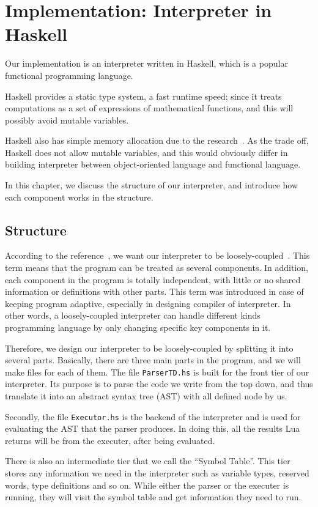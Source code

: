 \chapter{Implementation: Interpreter in Haskell}\label{chp: implementation}
Our implementation is an interpreter written in Haskell, which is a popular functional programming language. 

Haskell provides a static type system, a fast runtime speed; since it treats computations as a set of expressions of mathematical functions, and this will possibly avoid mutable variables. 

Haskell also has simple memory allocation due to the research~\cite{PIH}. As the trade off, Haskell does not allow mutable variables, and this would obviously differ in building interpreter between object-oriented language and functional language.

In this chapter, we discuss the structure of our interpreter, and introduce how each component works in the structure.

\section{Structure}
According to the reference~\cite{WCAI}, we want our interpreter to be loosely-coupled~\cite{looseC}. This term means that the program can be treated as several components. In addition, each component in the program is totally independent, with little or no shared information or definitions with other parts. This term was introduced in case of keeping program adaptive, especially in designing compiler of interpreter. In other words, a loosely-coupled interpreter can handle different kinds programming language by only changing specific key components in it.

Therefore, we design our interpreter to be loosely-coupled by splitting it into several parts. Basically, there are three main parts in the program, and we will make files for each of them. The file {\tt ParserTD.hs} is built for the front tier of our interpreter. Its purpose is to parse the code we write from the top down, and thus translate it into an abstract syntax tree (AST) with all defined node by us. 

Secondly, the file {\tt Executor.hs} is the backend of the interpreter and is used for evaluating the AST that the parser produces. In doing this, all the results Lua returns will be from the executer, after being evaluated. 

There is also an intermediate tier that we call the ``Symbol Table''. This tier stores any information we need in the interpreter such as variable types, reserved words, type definitions and so on. While either the parser or the executer is running, they will visit the symbol table and get information they need to run. 


